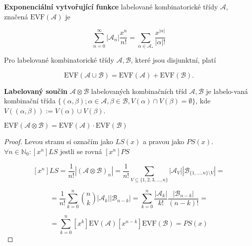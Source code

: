 \begin{definice}
	\textbf{Exponenciální vytvořující funkce} labelované kombinatorické třídy $\mathcal{A}$, značená $\text{EVF}(\mathcal{A})$ je
	
	$$
	\sum_{n=0}^{\infty}|\mathcal{A}_{n}|\frac{x^{n}}{n!} = \sum_{\alpha \in \mathcal{A}_{\ast}} \frac{x^{|\alpha|}}{|\alpha|!}
	$$
\end{definice}

\begin{pozor}
	Pro labelované kombinatorické třídy $\mathcal{A}, \mathcal{B}$, které jsou disjunktní, platí
	
	$$
	\text{EVF}(\mathcal{A} \cup \mathcal{B}) = \text{EVF}(\mathcal{A}) + \text{EVF}(\mathcal{B}).
	$$
\end{pozor}

\begin{definice}
	\textbf{Labelovaný součin} $\mathcal{A} \otimes \mathcal{B}$ labelovaných kombinačních tříd $\mathcal{A}, \mathcal{B}$ je labelo-\newline vaná kombinační třída $\{(\alpha, \beta); \alpha \in \mathcal{A}, \beta \in \mathcal{B}, V(\alpha) \cap V(\beta) = \emptyset\}$, kde $V((\alpha, \beta)) := V(\alpha) \cup V(\beta)$.
\end{definice}

\begin{tvrz}
	$\text{EVF}(\mathcal{A} \otimes \mathcal{B}) = \text{EVF}(\mathcal{A}) \cdot \text{EVF}(\mathcal{B})$
\end{tvrz}

\begin{proof}
	Levou stranu si označím jako $LS(x)$ a pravou jako $PS(x)$. $\forall n \in \mathbb{N}_{0}: [x^{n}] LS$ jestli se rovná $[x^{n}] PS$
	
	$$
	[x^{n}]LS = \frac{1}{n!} |(\mathcal{A} \otimes \mathcal{B})_{n}| = \frac{1}{n!} \sum_{V \subseteq \{1,2,3, \dots ,n\}} |\mathcal{A}_{V}| |\mathcal{B}_{\{1,\dots,n\} \setminus V}| =
	$$
	
	$$
	= \frac{1}{n!} \sum_{k=0}^{n} \binom{n}{k} |\mathcal{A}_{k}| |\mathcal{B}_{n-k}| = \sum_{k = 0}^{n} \frac{|\mathcal{A}_{k}|}{k!} \frac{|\mathcal{B}_{n-k}|}{(n-k)!} =
	$$
	
	$$
	= \sum_{k=0}^{n} [x^{k}]\text{EV}(\mathcal{A})[x^{n-k}]\text{EVF}(\mathcal{B}) = PS(x)
	$$
\end{proof}
